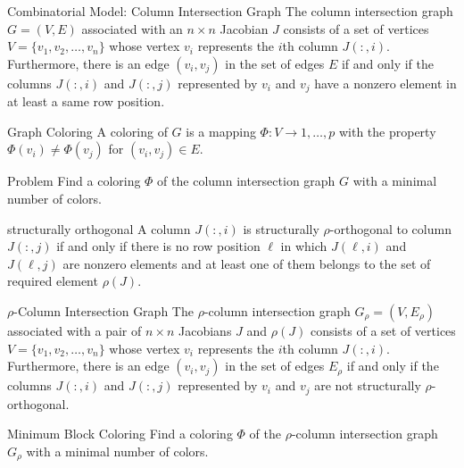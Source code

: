 \documentclass{beamer}
\newcommand{\sparsifysymbol}{\ensuremath{\rho}}
\newcommand{\sparsify}[1]{\ensuremath{\sparsifysymbol(#1)}}
\begin{document}
\begin{frame}{Combinatorial Model: Column Intersection Graph}
The column intersection graph $G = (V,E)$ associated with an $n \times n$ Jacobian $J$
consists of a set of vertices $V=\{v_1, v_2, \dots, v_n\}$ whose vertex $v_i$ represents
the $i$th column $J(:,i)$. Furthermore, there is an edge $(v_i,v_j)$ in the set of edges
$E$ if and only if the columns $J(:,i)$ and $J(:,j)$ represented by $v_i$ and $v_j$ have
a nonzero element in at least a same row position.
\end{frame}

\begin{frame}{Graph Coloring}
A coloring of $G$ is a mapping $\Phi : V \to {1, \dots, p}$ with the property
$\Phi(v_i)\neq \Phi(v_j)$ for $(v_i,v_j) \in E$.

\begin{alertblock}{Problem}
Find a coloring $\Phi$ of the column intersection graph $G$ with a minimal number of
colors.
\end{alertblock}
\end{frame}

\begin{frame}{structurally orthogonal}
A column $J(:,i)$ is structurally $\sparsifysymbol$-orthogonal to column $J(:,j)$ if and
only if there is no row position $\ell$ in which $J(\ell,i)$ and $J(\ell,j)$ are nonzero
elements and at least one of them belongs to the set of required element \sparsify{J}.
\end{frame}

\begin{frame}{$\sparsifysymbol$-Column Intersection Graph}
The $\sparsifysymbol$-column intersection graph $G_\sparsifysymbol =
(V,E_\sparsifysymbol)$ associated with a pair of $n \times n$ Jacobians $J$ and
\sparsify{J} consists of a set of vertices $V=\{v_1, v_2, \dots, v_n\}$ whose vertex
$v_i$ represents the $i$th column $J(:,i)$. Furthermore, there is an edge $(v_i,v_j)$ in
the set of edges $E_\sparsifysymbol$ if and only if the columns $J(:,i)$ and $J(:,j)$
represented by $v_i$ and $v_j$ are not structurally $\sparsifysymbol$-orthogonal.
\end{frame}

\begin{frame}{Minimum Block Coloring}
Find a coloring $\Phi$ of the $\sparsifysymbol$-column intersection graph
$G_\sparsifysymbol$ with a minimal number of colors.
\end{frame}
\end{document}
